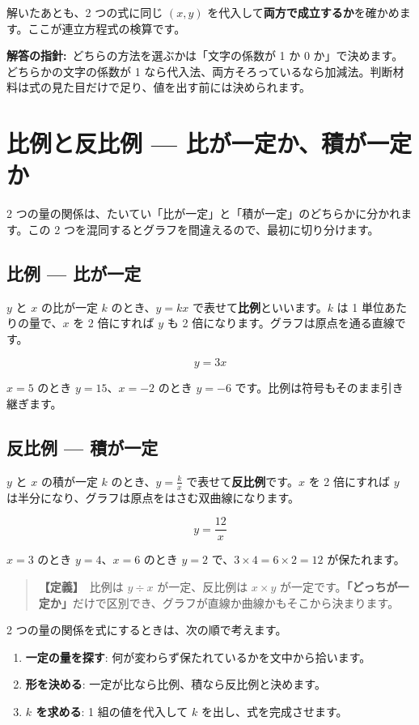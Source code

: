 \documentclass{article}
\begin{document}
解いたあとも、2 つの式に同じ \((x, y)\) を代入して\textbf{両方で成立するか}を確かめます。ここが連立方程式の検算です。

\textbf{解答の指針:}\ どちらの方法を選ぶかは「文字の係数が 1 か 0 か」で決めます。どちらかの文字の係数が 1 なら代入法、両方そろっているなら加減法。判断材料は式の見た目だけで足り、値を出す前には決められます。

\section{比例と反比例 — 比が一定か、積が一定か}

2 つの量の関係は、たいてい「比が一定」と「積が一定」のどちらかに分かれます。この 2 つを混同するとグラフを間違えるので、最初に切り分けます。

\subsection{比例 — 比が一定}

\(y\) と \(x\) の比が一定 \(k\) のとき、\(y = kx\) で表せて\textbf{比例}といいます。\(k\) は 1 単位あたりの量で、\(x\) を 2 倍にすれば \(y\) も 2 倍になります。グラフは原点を通る直線です。

\[ y = 3x \]

\(x = 5\) のとき \(y = 15\)、\(x = -2\) のとき \(y = -6\) です。比例は符号もそのまま引き継ぎます。

\subsection{反比例 — 積が一定}

\(y\) と \(x\) の積が一定 \(k\) のとき、\(y = \frac{k}{x}\) で表せて\textbf{反比例}です。\(x\) を 2 倍にすれば \(y\) は半分になり、グラフは原点をはさむ双曲線になります。

\[ y = \frac{12}{x} \]

\(x = 3\) のとき \(y = 4\)、\(x = 6\) のとき \(y = 2\) で、\(3 \times 4 = 6 \times 2 = 12\) が保たれます。

\begin{quote}
\textbf{【定義】}\ 比例は \(y \div x\) が一定、反比例は \(x \times y\) が一定です。\textbf{「どっちが一定か」}だけで区別でき、グラフが直線か曲線かもそこから決まります。
\end{quote}

2 つの量の関係を式にするときは、次の順で考えます。

\begin{enumerate}
\item \textbf{一定の量を探す}: 何が変わらず保たれているかを文中から拾います。
\item \textbf{形を決める}: 一定が比なら比例、積なら反比例と決めます。
\item \textbf{\(k\) を求める}: 1 組の値を代入して \(k\) を出し、式を完成させます。
\end{enumerate}
\end{document}
